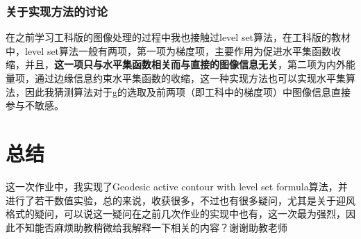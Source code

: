 \documentclass[a4paper, UTF8]{ctexrep}
\begin{document}
		\subsubsection{关于实现方法的讨论} %
		\label{ssub:关于实现方法的讨论}
			在之前学习工科版的图像处理的过程中我也接触过level set算法，在工科版的教材中，level set算法一般有两项，第一项为梯度项，主要作用为促进水平集函数收缩，并且，\textbf{这一项只与水平集函数相关而与直接的图像信息无关}，第二项为内外能量项，通过边缘信息约束水平集函数的收缩，这一种实现方法也可以实现水平集算法，因此我猜测算法对于g的选取及前两项（即工科中的梯度项）中图像信息直接参与不敏感。
	\section{总结} %
	\label{sec:总结}
		这一次作业中，我实现了Geodesic active contour with level set formula算法，并进行了若干数值实验，总的来说，收获很多，不过也有很多疑问，尤其是关于迎风格式的疑问，可以说这一疑问在之前几次作业的实现中也有，这一次最为强烈，因此不知能否麻烦助教稍微给我解释一下相关的内容？谢谢助教老师~ 

	    
\end{document}
